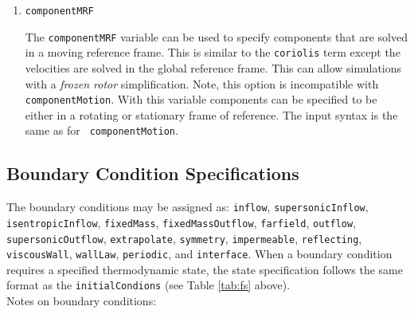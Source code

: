 \documentclass{article}
\begin{document}
\begin{enumerate}
\item {\tt componentMRF }

  The {\tt componentMRF} variable can be used to specify components
  that are solved in a moving reference frame.  This is similar to the
  {\tt coriolis} term except the velocities are solved in the global
  reference frame.  This can allow simulations with a {\it frozen
    rotor} simplification.  Note, this option is incompatible with
  {\tt componentMotion}.  With this variable components can be
  specified to be either in a rotating or stationary frame of
  reference.  The input syntax is the same as for {\tt
    componentMotion}.

\end{enumerate}

\subsection{Boundary Condition Specifications}


The boundary conditions may be assigned as:
  {\tt inflow}, {\tt supersonicInflow},
  {\tt isentropicInflow}, {\tt fixedMass}, {\tt fixedMassOutflow},
  {\tt farfield}, {\tt outflow}, {\tt supersonicOutflow},
  {\tt extrapolate}, {\tt symmetry}, {\tt impermeable},
  {\tt reflecting}, {\tt viscousWall}, {\tt wallLaw}, {\tt periodic},
  and {\tt interface}.  When a boundary condition requires a specified thermodynamic
  state, the state specification follows the same format as the {\tt initialCondions}
  (see Table \ref{tab:fs} above).\\
  
  Notes on boundary conditions:
\end{document}

